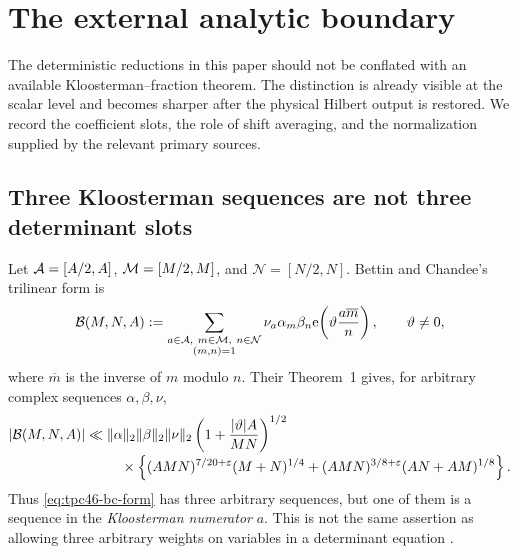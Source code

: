 \section{The external analytic boundary}
\label{sec:tpc46-literature-boundary}

The deterministic reductions in this paper should not be conflated with an
available Kloosterman--fraction theorem.  The distinction is already visible
at the scalar level and becomes sharper after the physical Hilbert output is
restored.  We record the coefficient slots, the role of shift averaging, and
the normalization supplied by the relevant primary sources.

\subsection{Three Kloosterman sequences are not three determinant slots}
\label{subsec:tpc46-bc-slots}

Let \(\mathcal A=[A/2,A]\), \(\mathcal M=[M/2,M]\), and
\(\mathcal N=[N/2,N]\).  Bettin and Chandee's trilinear form is
\begin{equation}
 \mathcal B(M,N,A)
 :=
 \sum_{\substack{a\in\mathcal A,\ m\in\mathcal M,\ n\in\mathcal N\\(m,n)=1}}
 \nu_a\alpha_m\beta_n
 \mathrm e\!\left(\vartheta\frac{a\overline m}{n}\right),
 \qquad \vartheta\ne0,
 \label{eq:tpc46-bc-form}
\end{equation}
where \(\overline m\) is the inverse of \(m\) modulo \(n\).  Their
Theorem~1 gives, for arbitrary complex sequences
\(\alpha,\beta,\nu\),
\begin{align}
 |\mathcal B(M,N,A)|
 \ll {}&
 \|\alpha\|_2\|\beta\|_2\|\nu\|_2
 \left(1+\frac{|\vartheta|A}{MN}\right)^{1/2}
 \notag\\[-2pt]
 &\quad\times
 \left\{
 (AMN)^{7/20+\varepsilon}(M+N)^{1/4}
 +(AMN)^{3/8+\varepsilon}(AN+AM)^{1/8}
 \right\}.
 \label{eq:tpc46-bc-theorem}
\end{align}
Thus \eqref{eq:tpc46-bc-form} has three arbitrary sequences, but one
of them is a sequence in the \emph{Kloosterman numerator} \(a\).  This
is not the same assertion as allowing three arbitrary weights on
variables in a determinant equation \citep[Theorem~1]{BC2018}.

